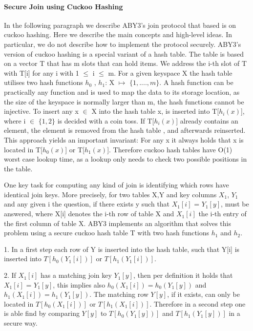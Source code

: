 \paragraph{Secure Join using Cuckoo Hashing}
In the following paragraph we describe ABY3's join protocol that based is on cuckoo hashing. Here we describe the main concepts and high-level ideas. In particular, we do not describe how to implement the protocol securely.  
ABY3's version of cuckoo hashing is a special variant of a hash table. The table is based on a vector T that has m slots that can hold items. We address the i-th slot of T with T[i] for any i with 1 $\leq$ i $ \leq $ m. For a given keyspace X the hash table utilises two hash functions $ h_0 $ , $ h_1 $: X $ \mapsto $   $ \{ 1,....,m \} $. A hash function can be practically any function and is used to map the data to its storage location, as the size of the keyspace is normally larger than m, the hash functions cannot be injective.
To insert any x $ \in $ X into the hash table x, is inserted into T[$h_i(x)$], where i $ \in $ $ \{ 1,2 \} $ is decided with a coin toss. If T[$h_i(x)$] already contains an element, the element is removed from the hash table , and afterwards reinserted. This approach yields an important invariant: For any x it always holds that x is located in T[$h_0(x)$] or T[$h_1(x)$]. Therefore cuckoo hash tables have O(1) worst case lookup time, as a lookup only needs to check two possible positions in the table. 


One key task for computing any kind of join is identifying which rows have identical join keys. More precisely, for two tables X,Y and key columns $X_1$, $Y_1$ and any given i the question, if there exists y such that $X_1[i]$ = $Y_1[y]$, must be answered, where X[i] denotes the i-th row of table X and $ X_1[i] $ the i-th entry of the first column of table X.  ABY3 implements an algorithm that solves this problem using a secure cuckoo hash table T with two hash functions $ h_1 $ and $h_2$. 

1. In a first step each row of Y is inserted into the hash table, such that Y[i] is inserted into $ T[h_0(Y_1 [i]  )] $ or $T[h_1(Y_1 [i]  )] $. 

2. If $X_1[i]$ has a matching join key $Y_1[y]$, then per definition it holds that  $X_1[i]$ = $Y_1[y]$, this implies also $ h_0(X_1[i]) = h_0(Y_1[y])$ and $ h_1(X_1[i]) = h_1(Y_1[y])$. The matching row $Y[y]$, if it exists, can only be located in $ T[h_0(X_1[i])] $ or $T[h_1( X_1[i])] $. 
Therefore in a second step one is able find by comparing $Y[y]$ to $ T[h_0(Y_1[y])] $ and $T[h_1(Y_1[y])] $ in a secure way. 

